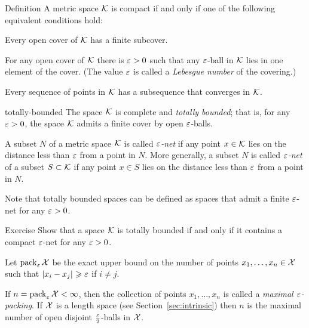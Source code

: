 \begin{thm}{Definition}\label{def:compact}
A metric space $\mathcal{K}$ is compact if and only if one of the following equivalent conditions hold:

\begin{subthm}{}
 Every open cover of $\mathcal{K}$ has a finite subcover.
\end{subthm}

\begin{subthm}{}
 For any open cover of $\mathcal{K}$ there is $\varepsilon>0$ such that any $\varepsilon$-ball in $\mathcal{K}$ lies in one element of the cover. (The value $\varepsilon$ is called a \emph{Lebesgue number} of the covering.)
\end{subthm}

\begin{subthm}{}
 Every sequence of points in $\mathcal{K}$ has a subsequence that converges in $\mathcal{K}$.
\end{subthm}

\begin{subthm}{totally-bounded}
The space $\mathcal{K}$ is complete and \emph{totally bounded}; that is, for any $\varepsilon>0$, the space $\mathcal{K}$ admits a finite cover by open $\varepsilon$-balls.
\end{subthm}

\end{thm}

A subset $N$ of a metric space $\mathcal{K}$ is called \emph{$\varepsilon$-net} if any point $x\in \mathcal{K}$ lies on the distance less than $\varepsilon$ from a point in $N$.
More generally, a subset $N$ is called \emph{$\varepsilon$-net} of a subset $S\subset\mathcal{K}$ if any point $x\in S$ lies on the distance less than $\varepsilon$ from a point in $N$. 

Note that totally bounded spaces can be defined as spaces that admit a finite $\varepsilon$-net for any $\varepsilon>0$.


\begin{thm}{Exercise}\label{ex:compact-net}
Show that a space $\mathcal{K}$ is totally bounded if and only if it contains a compact $\varepsilon$-net for any $\varepsilon>0$. 
\end{thm}


Let $\operatorname{\rm pack}\nolimits_\varepsilon\mathcal{X}$ be the exact upper bound on the number of points $x_1,\z\dots,x_n\in \spc{X}$ such that $\dist{x_i}{x_j}{}\ge\eps$ if $i\ne j$.

If $n=\operatorname{\rm pack}\nolimits_\varepsilon\mathcal{X}<\infty$, then
the collection of points $x_1,\dots,x_n$ is called a \emph{maximal $\varepsilon$-packing}.
If $\mathcal{X}$ is a length space (see Section~\ref{sec:intrinsic}) then $n$ is the maximal number of open disjoint $\tfrac{\varepsilon}2$-balls in $\mathcal{X}$.


